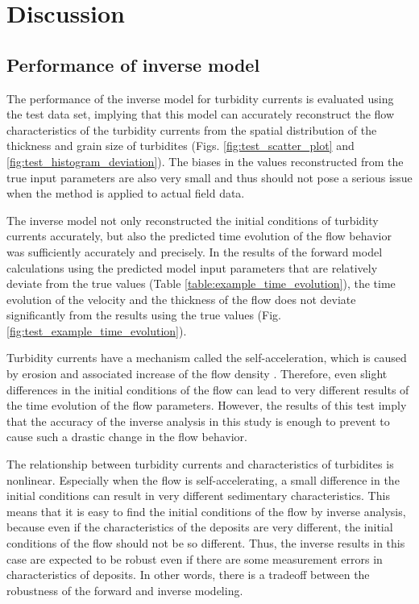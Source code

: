 \section{Discussion}

\subsection{Performance of inverse model}
The performance of the inverse model for turbidity currents is evaluated using the test data set, implying that this model can accurately reconstruct the flow characteristics of the turbidity currents from the spatial distribution of the thickness and grain size of turbidites (Figs. \ref{fig:test_scatter_plot} and \ref{fig:test_histogram_deviation}). The biases in the values reconstructed from the true input parameters are also very small and thus should not pose a serious issue when the method is applied to actual field data.  

The inverse model not only reconstructed the initial conditions of turbidity currents accurately, but also the predicted time evolution of the flow behavior was sufficiently accurately and precisely. In the results of the forward model calculations using the predicted model input parameters that are relatively deviate from the true values (Table \ref{table:example_time_evolution}), the time evolution of the velocity and the thickness of the flow does not deviate significantly from the results using the true values (Fig. \ref{fig:test_example_time_evolution}).

Turbidity currents have a mechanism called the self-acceleration, which is caused by erosion and associated increase of the flow density \citep{parker1986self,Naruse2007,Sequeiros2009}. Therefore, even slight differences in the initial conditions of the flow can lead to very different results of the time evolution of the flow parameters. However, the results of this test imply that the accuracy of the inverse analysis in this study is enough to prevent to cause such a drastic change in the flow behavior.

The relationship between turbidity currents and characteristics of turbidites is nonlinear. Especially when the flow is self-accelerating, a small difference in the initial conditions can result in very different sedimentary characteristics. This means that it is easy to find the initial conditions of the flow by inverse analysis, because even if the characteristics of the deposits are very different, the initial conditions of the flow should not be so different. Thus, the inverse results in this case are expected to be robust even if there are some measurement errors in characteristics of deposits. In other words, there is a tradeoff between the robustness of the forward and inverse modeling.

